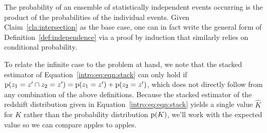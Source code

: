 \begin{claim}\label{lem:independence}
	The probability of an ensemble of statistically independent events occurring is the product of the probabilities of the individual events.
	Given Claim~\ref{cla:intersection} as the base case, one can in fact write the general form of Definition~\ref{def:independence} via a proof by induction that similarly relies on conditional probability.
\end{claim}



To relate the infinite case to the problem at hand, we note that the stacked estimator of Equation~\ref{intro:eq:eqn:stack} can only hold if $\mathrm{p}(z_{1} = z' \cap z_{2} = z') = \mathrm{p}(z_{1} = z') + \mathrm{p}(z_{2} = z')$, which does not directly follow from any combination of the above definitions.
Because the stacked estimator of the redshift distribution given in Equation~\ref{intro:eq:eqn:stack} yields a single value $\hat{K}$ for $K$ rather than the probability distribution $\mathrm{p}(K)$, we'll work with the expected value so we can compare apples to apples.

